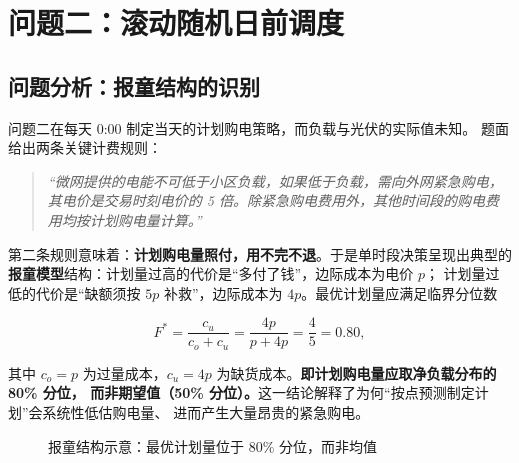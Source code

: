﻿%
\section{问题二：滚动随机日前调度}

\subsection{问题分析：报童结构的识别}

问题二在每天 $0$:00 制定当天的计划购电策略，而负载与光伏的实际值未知。
题面给出两条关键计费规则：

\begin{quote}
\textit{“微网提供的电能不可低于小区负载，如果低于负载，需向外网紧急购电，
其电价是交易时刻电价的 5 倍。除紧急购电费用外，其他时间段的购电费用均按计划购电量计算。”}
\end{quote}

第二条规则意味着：\textbf{计划购电量照付，用不完不退}。于是单时段决策呈现出典型的
\textbf{报童模型}结构：计划量过高的代价是“多付了钱”，边际成本为电价 $p$；
计划量过低的代价是“缺额须按 $5p$ 补救”，边际成本为 $4p$。最优计划量应满足临界分位数

\begin{equation}
F^*=\frac{c_u}{c_o+c_u}=\frac{4p}{p+4p}=\frac{4}{5}=0.80,
\label{eq:newsvendor}
\end{equation}

其中 $c_o=p$ 为过量成本，$c_u=4p$ 为缺货成本。\textbf{即计划购电量应取净负载分布的 80\% 分位，
而非期望值（50\% 分位）。}这一结论解释了为何“按点预测制定计划”会系统性低估购电量、
进而产生大量昂贵的紧急购电。

\begin{figure}[H]
\centering
{}
\caption{报童结构示意：最优计划量位于 $80\%$ 分位，而非均值}
\label{fig:newsvendor}
\end{figure}

